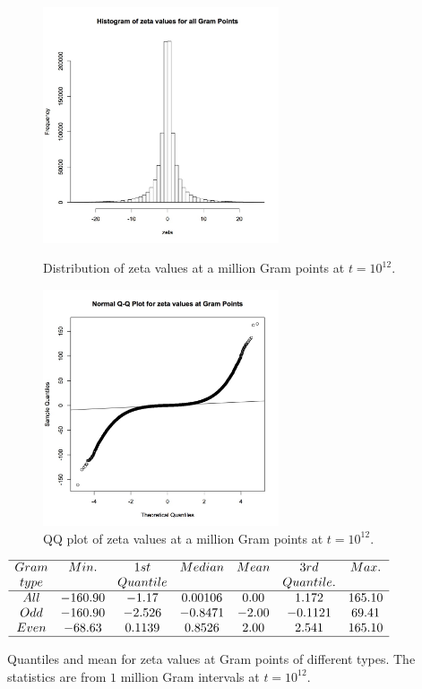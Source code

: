 \documentclass[twoside]{article}
\begin{document}
\begin{figure}
\centering
\includegraphics[width=0.62\textwidth]{rzeta.jpg}
\caption[]{ 
 Distribution of zeta values at a million Gram points  at $t = 10^{12}$.
  }
\vspace{1mm}
\label{allhist}

\includegraphics[width=0.62\textwidth]{qqr.jpg}
\caption[]{ 
 QQ plot of zeta values at a million Gram points  at $t = 10^{12}$.
  }
\vspace{1mm}
\label{qqr}
\end{figure}

\begin{table}
\centering \(\begin{array}{ccccccc}
\hline
 Gram &     Min.   & 1st    &  Median    &   Mean   & 3rd    &   Max. \\
 type &              & Quantile   &            &              & Quantile.    &   \\
\hline
All& -160.90 &   -1.17 &    0.00106 &   0.00  &  1.172 &165.10\\
Odd&-160.90 &   -2.526 &   -0.8471  & -2.00 &   -0.1121 &  69.41 \\
Even&-68.63 &   0.1139 &  0.8526  & 2.00 &   2.541 & 165.10 \\
\hline
\end{array}\)
\caption{Quantiles and mean for zeta values at Gram points of different types.  The statistics are from $1$ million Gram intervals at $t=10^{12}$.} \label{tab:quantiles}
\end{table}
\end{document}
